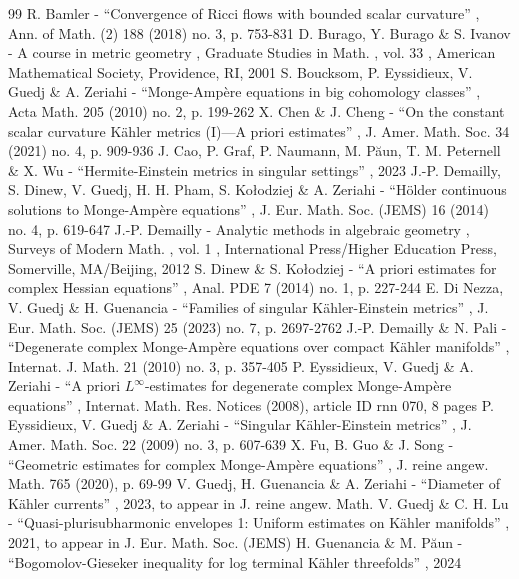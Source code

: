 \documentclass[11pt]{article}
\numberwithin{equation}{section}
\theoremstyle{definition}
\begin{document}

\begin{thebibliography}{99}
 R. Bamler - “Convergence of Ricci flows with bounded scalar curvature” , Ann. of Math. (2) 188 (2018) no. 3, p. 753-831
 D. Burago, Y. Burago \& S. Ivanov - A course in metric geometry , Graduate Studies in Math. , vol. 33 , American Mathematical Society, Providence, RI, 2001
 S. Boucksom, P. Eyssidieux, V. Guedj \& A. Zeriahi - “Monge-Ampère equations in big cohomology classes” , Acta Math. 205 (2010) no. 2, p. 199-262
 X. Chen \& J. Cheng - “On the constant scalar curvature Kähler metrics (I)—A priori estimates” , J. Amer. Math. Soc. 34 (2021) no. 4, p. 909-936
 J. Cao, P. Graf, P. Naumann, M. Păun, T. M. Peternell \& X. Wu - “Hermite-Einstein metrics in singular settings” , 2023
 J.-P. Demailly, S. Dinew, V. Guedj, H. H. Pham, S. Kołodziej \& A. Zeriahi - “Hölder continuous solutions to Monge-Ampère equations” , J. Eur. Math. Soc. (JEMS) 16 (2014) no. 4, p. 619-647
 J.-P. Demailly - Analytic methods in algebraic geometry , Surveys of Modern Math. , vol. 1 , International Press/Higher Education Press, Somerville, MA/Beijing, 2012
 S. Dinew \& S. Kołodziej - “A priori estimates for complex Hessian equations” , Anal. PDE 7 (2014) no. 1, p. 227-244
 E. Di Nezza, V. Guedj \& H. Guenancia - “Families of singular Kähler-Einstein metrics” , J. Eur. Math. Soc. (JEMS) 25 (2023) no. 7, p. 2697-2762
 J.-P. Demailly \& N. Pali - “Degenerate complex Monge-Ampère equations over compact Kähler manifolds” , Internat. J. Math. 21 (2010) no. 3, p. 357-405
 P. Eyssidieux, V. Guedj \& A. Zeriahi - “A priori $L^\infty $-estimates for degenerate complex Monge-Ampère equations” , Internat. Math. Res. Notices (2008), article ID rnn 070, 8 pages
 P. Eyssidieux, V. Guedj \& A. Zeriahi - “Singular Kähler-Einstein metrics” , J. Amer. Math. Soc. 22 (2009) no. 3, p. 607-639
 X. Fu, B. Guo \& J. Song - “Geometric estimates for complex Monge-Ampère equations” , J. reine angew. Math. 765 (2020), p. 69-99
 V. Guedj, H. Guenancia \& A. Zeriahi - “Diameter of Kähler currents” , 2023, to appear in J. reine angew. Math.
 V. Guedj \& C. H. Lu - “Quasi-plurisubharmonic envelopes 1: Uniform estimates on Kähler manifolds” , 2021, to appear in J. Eur. Math. Soc. (JEMS)
 H. Guenancia \& M. Păun - “Bogomolov-Gieseker inequality for log terminal Kähler threefolds” , 2024

\end{thebibliography}
\end{document}
